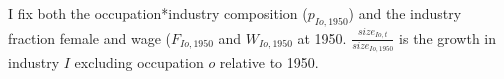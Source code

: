 \documentclass[12pt]{article}
\begin{document}


I fix both the occupation*industry composition ($p_{Io,1950}$) and the industry fraction female and wage ($ F_{Io,1950}$ and $ W_{Io,1950}$ at 1950. $\frac{size_{Io,t}}{size_{Io,1950}}$ is the growth in industry $I$ excluding occupation $o$ relative to 1950.






\end{document}
